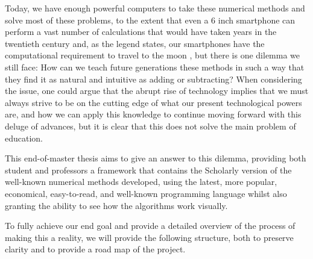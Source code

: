 Today, we have enough powerful computers to take these numerical methods and solve most of these problems, to the extent that even a 6 inch smartphone can perform a vast number of calculations that would have taken years in the twentieth century and, as the legend states, our smartphones have the computational requirement to travel to the moon , but there is one dilemma we still face: How can we teach future generations these methods in such a way that they find it as natural and intuitive as adding or subtracting? When considering the issue, one could argue that the abrupt rise of technology implies that we must always strive to be on the cutting edge of what our present technological powers are, and how we can apply this knowledge to continue moving forward with this deluge of advances,  but it is clear that this does not solve the main problem of education.


This end-of-master thesis aims to give an answer to this dilemma, providing both student and professors a framework that contains the Scholarly version of the well-known numerical methods developed, using the latest, more popular, economical, easy-to-read, and well-known programming language whilst also granting the ability to see how the algorithms work visually.  

To fully achieve our end goal and provide a detailed overview of the process of making this a reality, we will provide the following structure, both to preserve clarity and to provide a road map of the project. 

